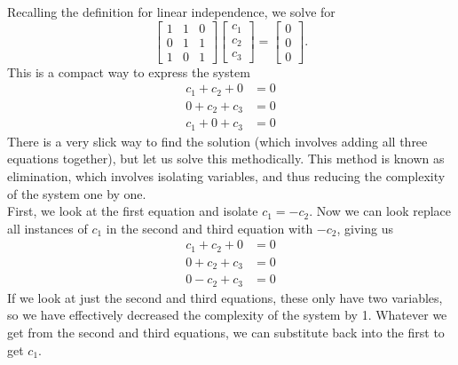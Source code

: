Recalling the definition for linear independence, we solve for 
\[
\begin{bmatrix}
	1&1&0\\
	0& 1 & 1\\
	1& 0 & 1
\end{bmatrix} \begin{bmatrix}
	c_1 \\ c_2\\c_3
\end{bmatrix} = \begin{bmatrix}
	0\\0\\0
\end{bmatrix}.
\]
This is a compact way to express the system
\begin{align*}
	c_1 + c_2 + 0 &= 0 \\
	 0+  c_2 +  c_3 &= 0\\
	c_1+ 0+c_3 &= 0
\end{align*}
There is a very slick way to find the solution (which involves adding all three equations together), but let us solve this methodically. This method is known as elimination, which involves isolating variables, and thus reducing the complexity of the system one by one.
\\
First, we look at the first equation and isolate $c_1=-c_2$. Now we can look replace all instances of $c_1$ in the second and third equation with $-c_2$, giving us \begin{align*}
	c_1 + c_2 + 0 &= 0 \\
	0 +  c_2 +  c_3 &= 0\\
	0 - c_2 +c_3 &= 0
\end{align*}
If we look at just the second and third equations, these only have two variables, so we have effectively decreased the complexity of the system by 1. Whatever we get from the second and third equations, we can substitute back into the first to get $c_1$.
